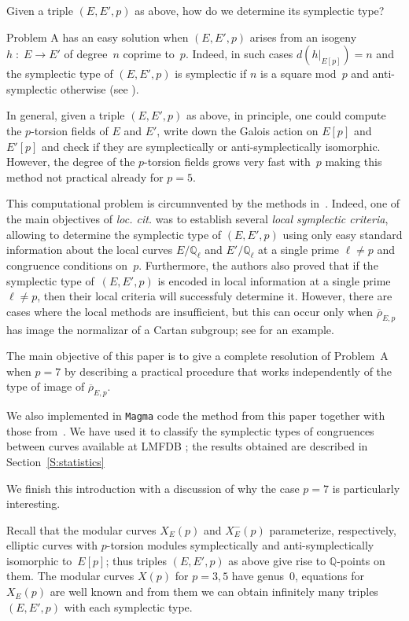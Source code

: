 \documentclass[12pt]{amsart}
\newcommand{\Q}{\mathbb{Q}}
\newcommand{\rhobar}{{\overline{\rho}}}
\numberwithin{equation}{section}
\theoremstyle{definition}
\theoremstyle{remark}
\begin{document}
Given a triple $(E,E',p)$ as above, how do we determine its symplectic type?

Problem A has an easy solution when 
$(E,E',p)$ arises from an isogeny $h \; \colon \; E \to E'$ of degree~$n$ coprime to~$p$. Indeed, 
in such cases $d(h|_{E[p]}) = n$ and the symplectic type of $(E,E',p)$ is 
symplectic if $n$ is a square mod~$p$ and anti-symplectic otherwise (see \cite[Corollary~1]{FKSym}). 

In general, given a triple $(E, E', p)$ as above, in principle,  one could compute 
the $p$-torsion fields of $E$ and $E'$, write down the Galois action on $E[p]$ and $E'[p]$ and check if they are symplectically or
anti-symplectically isomorphic. However, the degree of the $p$-torsion fields grows very fast with~$p$ making this method 
not practical already for $p = 5$. 

This computational problem is circumnvented by the methods 
in~\cite{FKSym}. Indeed, one of the main objectives of {\it loc. cit.} was to 
establish several {\it local symplectic criteria}, allowing
to determine the symplectic type of $(E,E',p)$
using only easy standard information about the local curves 
$E/\Q_\ell$ and $E'/\Q_\ell$ at a single prime $\ell \neq p$
and congruence conditions on~$p$. Furthermore, the authors also proved that if the symplectic type of~$(E,E',p)$ is encoded in local information at a single prime $\ell \neq p$, 
then their local criteria will successfuly determine it. 
However, there are cases where the local methods are insufficient, but this can occur only when $\rhobar_{E,p}$ has image the normalizar of a Cartan subgroup; 
see \cite[Proposition~12]{FKSym} for an example.  

The main objective of this paper is to give a complete resolution of Problem~A when $p=7$ by describing a practical procedure that works independently of the type of 
image of $\rhobar_{E,p}$.

We also implemented in {\tt Magma} code the method from this paper together with those from~\cite{FKSym}. We have used it
to classify the symplectic types 
of congruences between curves available at LMFDB \cite{lmfdb}; the results obtained are described in Section~\ref{S:statistics}


We finish this introduction with a discussion of why the case $p=7$ is particularly interesting. 

Recall that the modular curves $X_E(p)$ and $X_E^-(p)$ parameterize, respectively, elliptic curves with $p$-torsion modules symplectically and anti-symplectically isomorphic to~$E[p]$; thus triples $(E,E',p)$ as above give rise to $\Q$-points on them. The modular curves $X(p)$ for $p=3,5$ have genus~0, equations for $X_E(p)$ are well known and from them we can obtain infinitely many triples $(E,E',p)$ with each symplectic type.
\end{document}
